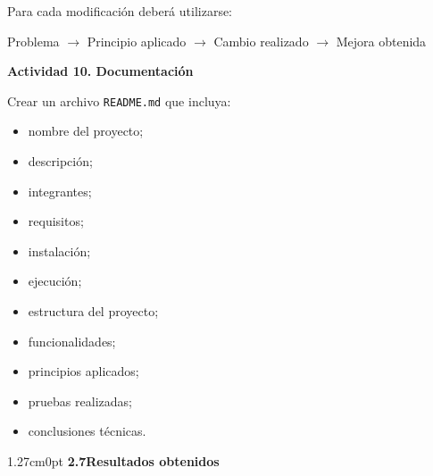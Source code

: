 \documentclass[12pt,letterpaper]{article}
\newcommand{\flechar}{$\rightarrow$}
\begin{document}
Para cada modificaci\'on deber\'a utilizarse:

Problema \flechar{} Principio aplicado \flechar{} Cambio realizado \flechar{} Mejora obtenida

\vspace{8pt}

\noindent\textbf{Actividad 10. Documentaci\'on}

\vspace{2pt}
Crear un archivo \texttt{README.md} que incluya:

\begin{itemize}[leftmargin=1.27cm, label=\textbullet, topsep=1pt, itemsep=0pt, parsep=0pt]
  \item nombre del proyecto;
  \item descripci\'on;
  \item integrantes;
  \item requisitos;
  \item instalaci\'on;
  \item ejecuci\'on;
  \item estructura del proyecto;
  \item funcionalidades;
  \item principios aplicados;
  \item pruebas realizadas;
  \item conclusiones t\'ecnicas.
\end{itemize}

\vspace{12pt}

\begin{adjustwidth}{1.27cm}{0pt}
\textbf{2.7\enspace Resultados obtenidos}
\end{adjustwidth}
\end{document}
